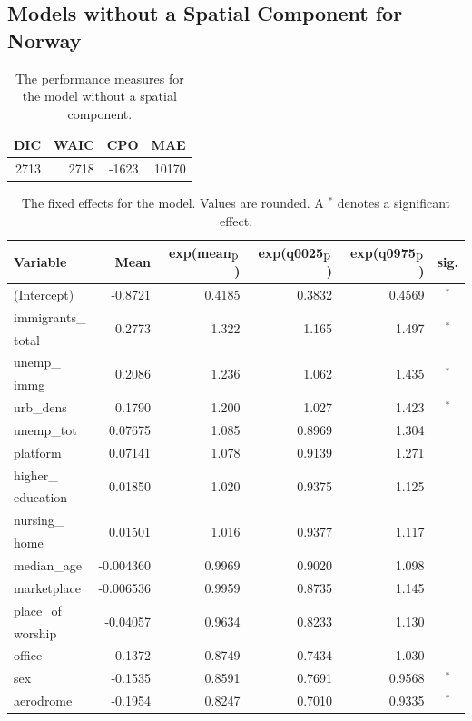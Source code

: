 \subsection{Models without a Spatial Component for Norway}\label{sec:nospatial_norway}
\begin{table}[H] 
\caption{The performance measures for the model without a spatial component. \label{allNorway_nospatial}}
\begin{tabular}{r r r r}
\toprule\textbf{DIC}	& \textbf{WAIC} & \textbf{CPO} & \textbf{MAE}\\
\midrule
2713 & 2718 & -1623 & 10170 \\
\bottomrule
\end{tabular}
\end{table} 
\begin{table}[H]
\caption{The fixed effects for the model. Values are rounded. A $^*$ denotes a significant effect. \label{fixedAllNorway_nospatial}}
\begin{tabular}{l r r r r c}
\toprule
\textbf{Variable}	& \textbf{Mean}	& \textbf{exp(mean$_{\hbox{p}}$)} & \textbf{exp(q0025$_{\hbox{p}}$)} & \textbf{exp(q0975$_{\hbox{p}}$)} & \textbf{sig.}\\
\midrule
(Intercept) & -0.8721 & 0.4185 & 0.3832 & 0.4569 & $^*$ \\
immigrants\_ & \multirow{2}{*}{0.2773}& \multirow{2}{*}{1.322}& \multirow{2}{*}{1.165}& \multirow{2}{*}{1.497}& \multirow{2}{*}{$^*$}\\
total \\
unemp\_ & \multirow{2}{*}{0.2086} & \multirow{2}{*}{1.236} & \multirow{2}{*}{1.062} & \multirow{2}{*}{1.435} & \multirow{2}{*}{$^*$} \\
immg\\
urb\_dens & 0.1790 & 1.200 & 1.027 & 1.423 & $^*$ \\
unemp\_tot & 0.07675 & 1.085 & 0.8969 & 1.304 \\
platform & 0.07141 & 1.078 & 0.9139 & 1.271 \\
higher\_ & \multirow{2}{*}{0.01850}& \multirow{2}{*}{1.020}& \multirow{2}{*}{0.9375}& \multirow{2}{*}{1.125}\\ 
education \\
nursing\_ & \multirow{2}{*}{0.01501} & \multirow{2}{*}{1.016} & \multirow{2}{*}{0.9377} & \multirow{2}{*}{1.117} \\
home\\
median\_age & -0.004360  & 0.9969 & 0.9020 & 1.098 \\
marketplace & -0.006536 & 0.9959 & 0.8735 & 1.145 \\
place\_of\_ & \multirow{2}{*}{-0.04057}& \multirow{2}{*}{0.9634}& \multirow{2}{*}{0.8233}& \multirow{2}{*}{1.130} \\
worship \\
office & -0.1372 & 0.8749 & 0.7434 & 1.030 \\
sex & -0.1535 & 0.8591 & 0.7691 & 0.9568 & $^*$ \\
aerodrome & -0.1954 & 0.8247 & 0.7010 & 0.9335 & $^*$ \\
\bottomrule
\end{tabular}
\end{table}
\clearpage
